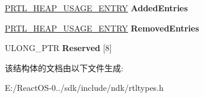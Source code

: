 \begin{DoxyCompactItemize}
\hyperlink{struct___r_t_l___h_e_a_p___u_s_a_g_e___e_n_t_r_y}{P\+R\+T\+L\+\_\+\+H\+E\+A\+P\+\_\+\+U\+S\+A\+G\+E\+\_\+\+E\+N\+T\+RY} {\bfseries Added\+Entries}
\item 
\mbox{\label{struct___r_t_l___h_e_a_p___u_s_a_g_e_afd0c161d93eab16c1de2fb6713cb3e8c}} 
\hyperlink{struct___r_t_l___h_e_a_p___u_s_a_g_e___e_n_t_r_y}{P\+R\+T\+L\+\_\+\+H\+E\+A\+P\+\_\+\+U\+S\+A\+G\+E\+\_\+\+E\+N\+T\+RY} {\bfseries Removed\+Entries}
\item 
\mbox{\label{struct___r_t_l___h_e_a_p___u_s_a_g_e_aced2c8275d0da1b65aa0efb938141c28}} 
U\+L\+O\+N\+G\+\_\+\+P\+TR {\bfseries Reserved} \mbox{[}8\mbox{]}
\end{DoxyCompactItemize}


该结构体的文档由以下文件生成\+:\begin{DoxyCompactItemize}
\item 
E\+:/\+React\+O\+S-\/0../sdk/include/ndk/rtltypes.\+h\end{DoxyCompactItemize}
